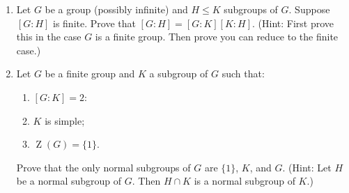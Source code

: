 \documentclass[12pt]{article}
\begin{document}
\begin{enumerate}
\medskip

\item Let $G$ be a group (possibly infinite) and $H\le K$ subgroups of $G$.  Suppose $[G:H]$ is finite.  Prove that $[G:H]=[G:K][K:H]$.  (Hint:  First prove this in the case $G$ is a finite group.  Then prove you can reduce to the finite case.)

\medskip

\item Let $G$ be a finite group and $K$ a subgroup of $G$ such that:
\begin{enumerate}
\item $[G:K]=2$:
\item $K$ is simple;
\item $\operatorname{Z}(G)=\{1\}$.
\end{enumerate}
Prove that the only normal subgroups of $G$ are $\{1\}$, $K$, and $G$.
(Hint: Let $H$ be a normal subgroup of $G$.  Then $H\cap K$ is a normal subgroup of $K$.)





\end{enumerate}
\end{document}
